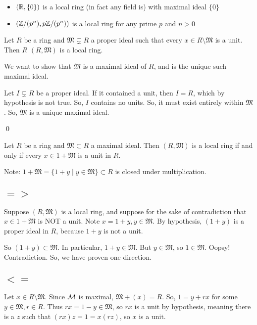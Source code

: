 \documentclass[x11names,reqno,14pt]{extarticle}
\newcommand{\mk}[1]{\mathfrak{#1}}
\begin{document}
\exm 

\begin{itemize}
\item $(\mathbb{R}, \{0\})$ is a local ring (in fact any field is) with maximal ideal $\{0\}$ 
\item $(\mathbb{Z}/(p^n), p\mathbb{Z}/(p^n))$ is a local ring for any prime $p$ and $n > 0$
\end{itemize}

\lem

Let $R$ be a ring and $\mathfrak{M}\subsetneq R$ a proper ideal such that every $x \in R\setminus\mathfrak{M}$ is a unit. Then $R$ $(R, \mathfrak{M})$ is a local ring. 

\proof

We want to show that $\mathfrak{M}$ is a maximal ideal of $R$, and is the unique such maximal ideal. 

Let $I \subsetneq R$ be a proper ideal. If it contained a unit, then $I = R$, which by hypothesis is not true. So, $I$ contains no units. So, it must exist entirely within $\mathfrak{M}$. So, $\mathfrak{M}$ is a unique maximal ideal. 

\qed

\prop Let $R$ be a ring and $\mathfrak{M}\subset R$ a maximal ideal. Then $(R, \mathfrak{M})$ is a local ring if and only if every $x \in 1 + \mathfrak{M}$ is a unit in $R$.

Note: $1 + \mathfrak{M} = \{1 + y \mid y \in \mathfrak{M}\}\subset R$ is closed under multiplication. 

\proof

\subsection*{$=>$}

Suppose $(R, \mk{M})$ is a local ring, and suppose for the sake of contradiction that $x \in 1 + \mk{M}$ is NOT a unit. Note $x = 1 + y, y \in \mk{M}$. By hypothesis, $(1 + y)$ is a proper ideal in $R$, because $1 + y$ is not a unit. 

So $(1 + y) \subset\mk{M}$. In particular, $1 + y \in \mk{M}$. But $y \in \mk{M}$, so $1 \in \mk{M}$. Oopsy! Contradiction. So, we have proven one direction. 

\subsection*{$<=$}

Let $x \in R\setminus\mk{M}$. Since $\mathcal{M}$ is maximal, $\mk{M} + (x) = R$. So, $1 = y + rx$ for some $y \in \mk{M}, r \in R$. Thus $rx = 1 - y \in \mk{M}$, so $rx$ is a unit by hypothesis, meaning there is a $z$ such that $(rx)z = 1 = x(rz)$, so $x$ is a unit. 
\end{document}
